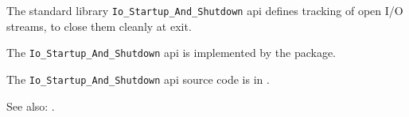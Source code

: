 
The standard library {\tt Io\_Startup\_And\_Shutdown} api defines tracking of open I/O streams, to close them cleanly at exit.

The {\tt Io\_Startup\_And\_Shutdown} api is implemented by the  package.

The {\tt Io\_Startup\_And\_Shutdown} api source code is in .

See also: .




